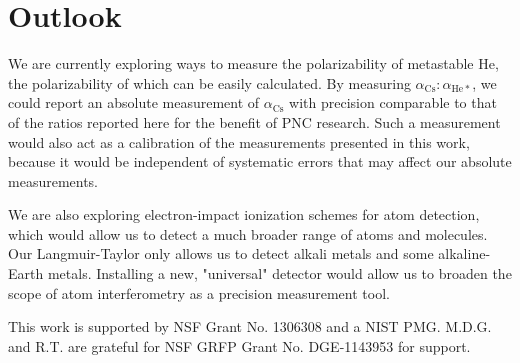 \documentclass[twocolumn,prl,showpacs,superscriptaddress]{revtex4-1}   %
\newcommand{\acs}{\alpha_{\textrm{Cs}}}
\begin{document}
\section{Outlook}

We are currently exploring ways to measure the polarizability of metastable He, the polarizability of which can be easily calculated. By measuring $\acs:\alpha_{\mathrm{He*}}$, we could report an absolute measurement of $\acs$ with precision comparable to that of the ratios reported here for the benefit of PNC research. Such a measurement would also act as a calibration of the measurements presented in this work, because it would be independent of systematic errors that may affect our absolute measurements.

We are also exploring electron-impact ionization schemes for atom detection, which would allow us to detect a much broader range of atoms and molecules. Our Langmuir-Taylor only allows us to detect alkali metals and some alkaline-Earth metals. Installing a new, "universal" detector would allow us to broaden the scope of atom interferometry as a precision measurement tool. 

This work is supported by NSF Grant No. 1306308 and a NIST PMG. M.D.G. and R.T. are grateful for NSF GRFP Grant No. DGE-1143953 for support. 


%

\end{document}
